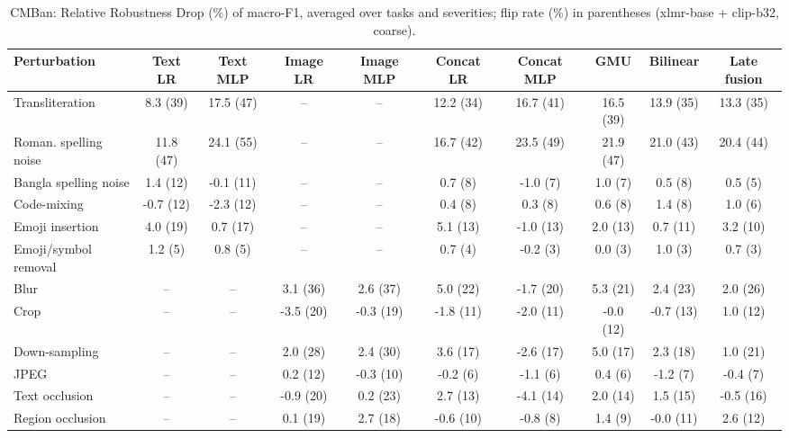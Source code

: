 \begin{table}[t]
\centering
\small
\caption{CMBan: Relative Robustness Drop (\%) of macro-F1, averaged over tasks and severities; flip rate (\%) in parentheses (xlmr-base + clip-b32, coarse).}
\label{tab:rob_coarse_cmban}
\begin{adjustbox}{max width=\textwidth}
\begin{tabular}{lccccccccc}
\toprule
Perturbation & Text LR & Text MLP & Image LR & Image MLP & Concat LR & Concat MLP & GMU & Bilinear & Late fusion \\
\midrule
Transliteration & 8.3 (39) & 17.5 (47) & -- & -- & 12.2 (34) & 16.7 (41) & 16.5 (39) & 13.9 (35) & 13.3 (35) \\
Roman. spelling noise & 11.8 (47) & 24.1 (55) & -- & -- & 16.7 (42) & 23.5 (49) & 21.9 (47) & 21.0 (43) & 20.4 (44) \\
Bangla spelling noise & 1.4 (12) & -0.1 (11) & -- & -- & 0.7 (8) & -1.0 (7) & 1.0 (7) & 0.5 (8) & 0.5 (5) \\
Code-mixing & -0.7 (12) & -2.3 (12) & -- & -- & 0.4 (8) & 0.3 (8) & 0.6 (8) & 1.4 (8) & 1.0 (6) \\
Emoji insertion & 4.0 (19) & 0.7 (17) & -- & -- & 5.1 (13) & -1.0 (13) & 2.0 (13) & 0.7 (11) & 3.2 (10) \\
Emoji/symbol removal & 1.2 (5) & 0.8 (5) & -- & -- & 0.7 (4) & -0.2 (3) & 0.0 (3) & 1.0 (3) & 0.7 (3) \\
Blur & -- & -- & 3.1 (36) & 2.6 (37) & 5.0 (22) & -1.7 (20) & 5.3 (21) & 2.4 (23) & 2.0 (26) \\
Crop & -- & -- & -3.5 (20) & -0.3 (19) & -1.8 (11) & -2.0 (11) & -0.0 (12) & -0.7 (13) & 1.0 (12) \\
Down-sampling & -- & -- & 2.0 (28) & 2.4 (30) & 3.6 (17) & -2.6 (17) & 5.0 (17) & 2.3 (18) & 1.0 (21) \\
JPEG & -- & -- & 0.2 (12) & -0.3 (10) & -0.2 (6) & -1.1 (6) & 0.4 (6) & -1.2 (7) & -0.4 (7) \\
Text occlusion & -- & -- & -0.9 (20) & 0.2 (23) & 2.7 (13) & -4.1 (14) & 2.0 (14) & 1.5 (15) & -0.5 (16) \\
Region occlusion & -- & -- & 0.1 (19) & 2.7 (18) & -0.6 (10) & -0.8 (8) & 1.4 (9) & -0.0 (11) & 2.6 (12) \\
\bottomrule
\end{tabular}
\end{adjustbox}
\end{table}
